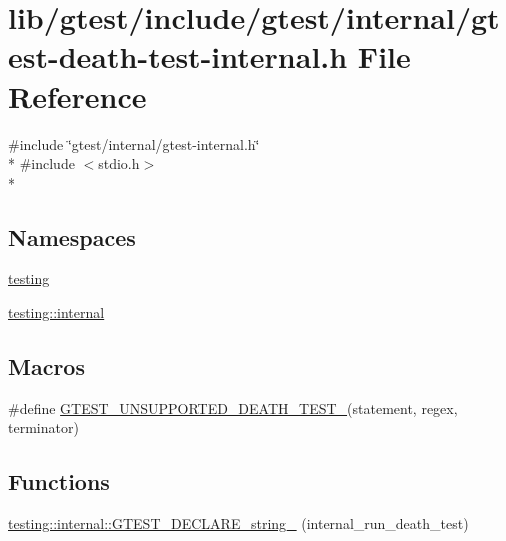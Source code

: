\hypertarget{gtest-death-test-internal_8h}{\section{lib/gtest/include/gtest/internal/gtest-\/death-\/test-\/internal.h File Reference}
\label{gtest-death-test-internal_8h}
}
{\ttfamily \#include \char`\"{}gtest/internal/gtest-\/internal.\-h\char`\"{}}\\*
{\ttfamily \#include $<$stdio.\-h$>$}\\*
\subsection*{Namespaces}
\begin{DoxyCompactItemize}
\item 
\hyperlink{namespacetesting}{testing}
\item 
\hyperlink{namespacetesting_1_1internal}{testing\-::internal}
\end{DoxyCompactItemize}
\subsection*{Macros}
\begin{DoxyCompactItemize}
\item 
\#define \hyperlink{gtest-death-test-internal_8h_a29a145cda8bd2d0c6a78b0ac1d670d18}{G\-T\-E\-S\-T\-\_\-\-U\-N\-S\-U\-P\-P\-O\-R\-T\-E\-D\-\_\-\-D\-E\-A\-T\-H\-\_\-\-T\-E\-S\-T\-\_\-}(statement, regex, terminator)
\end{DoxyCompactItemize}
\subsection*{Functions}
\begin{DoxyCompactItemize}
\item 
\hyperlink{namespacetesting_1_1internal_ac20f635c3285878fc1195ce687f23950}{testing\-::internal\-::\-G\-T\-E\-S\-T\-\_\-\-D\-E\-C\-L\-A\-R\-E\-\_\-string\-\_\-} (internal\-\_\-run\-\_\-death\-\_\-test)
\end{DoxyCompactItemize}


